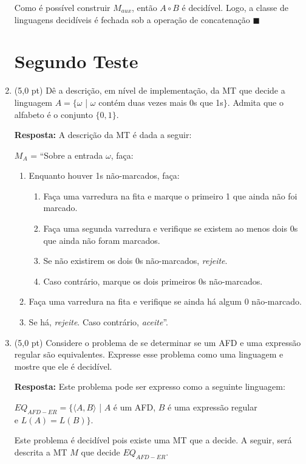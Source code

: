 \documentclass[12pt,a4paper,oneside]{article}
\begin{document}
\begin{enumerate}
{		Como é possível construir $M_{aux}$, então $A \circ B$ é decidível. Logo, a classe de linguagens decidíveis é fechada sob a operação de concatenação $\blacksquare$
	}
	
	\newpage
	
	\section*{Segundo Teste}
	
	\item (5,0 pt) Dê a descrição, em nível de implementação, da MT que decide a linguagem $A = \{\omega$ | $\omega$ contém duas vezes mais 0s que 1s$\}$. Admita que o alfabeto é o conjunto $\{0,1\}$.
	
	\vspace*{0.1cm}
	
	{\color{blue} {\bf Resposta:} A descrição da MT é dada a seguir:
	
	$M_{A}$ = ``Sobre a entrada $\omega$, faça:
	\begin{enumerate}
		\item Enquanto houver 1s não-marcados, faça:
		\begin{enumerate}
			\item Faça uma varredura na fita e marque o primeiro 1 que ainda não foi marcado.
			\item Faça uma segunda varredura e verifique se existem ao menos dois 0s que ainda não foram marcados.
			\item Se não existirem os dois 0s não-marcados, {\it rejeite}.
			\item Caso contrário, marque os dois primeiros 0s não-marcados.
		\end{enumerate}
		\item Faça uma varredura na fita e verifique se ainda há algum 0 não-marcado.
		\item Se há, {\it rejeite}. Caso contrário, {\it aceite}''.
	\end{enumerate}
		
	}
	
	\newpage
	
	\item (5,0 pt) Considere o problema de se determinar se um AFD e uma expressão regular são equivalentes. Expresse esse problema como uma linguagem e mostre que ele é decidível.
	
	\vspace*{0.1cm}
	
	{\color{blue} {\bf Resposta:} Este problema pode ser expresso como a seguinte linguagem:
		\begin{center}
			$EQ_{AFD-ER} = \{ \langle A, B\rangle$ | $A$ é um AFD, $B$ é uma expressão regular\\
			e $L(A) = L(B) \}$.
		\end{center}
	Este problema é decidível pois existe uma MT que a decide. A seguir, será descrita a MT $M$ que decide $EQ_{AFD-ER}$.
	
}
\end{enumerate}
\end{document}
